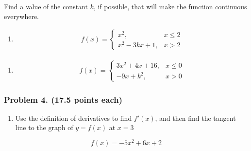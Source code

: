 \documentclass[
  letterpaper,
  DIV=11,
  numbers=noendperiod]{scrartcl}
\providecommand{\tightlist}{%
  \setlength{\itemsep}{0pt}\setlength{\parskip}{0pt}}\usepackage{longtable,booktabs,array}
\begin{document}
Find a value of the constant \(k\), if possible, that will make the
function continuous everywhere.

\begin{enumerate}
\def\labelenumi{\alph{enumi}.}
\tightlist
\item
  \begin{align*}
  f(x) =
   \left\{\begin{array}{lr}
     x^2, & x \le 2 \\
     x^2 - 3kx+1, & x > 2  
  \end{array}\right.
  \end{align*}
\end{enumerate}

\hfill\break
\hfill\break
\hfill\break
\hfill\break

\hfill\break
\hfill\break
\hfill\break
\hfill\break

\thispagestyle{empty}

\begin{enumerate}
\def\labelenumi{\alph{enumi}.}
\setcounter{enumi}{1}
\tightlist
\item
  \begin{align*}
  f(x) =
   \left\{\begin{array}{lr}
     3x^2 + 4x + 16, & x \le 0 \\
    - 9x + k^2, & x > 0
  \end{array}\right.
  \end{align*}
\end{enumerate}

\hfill\break
\hfill\break
\hfill\break
\hfill\break

\hfill\break
\hfill\break
\hfill\break
\hfill\break

\thispagestyle{empty}

\subsubsection{Problem 4. (17.5 points
each)}\label{problem-4.-17.5-points-each}

\begin{enumerate}
\def\labelenumi{\alph{enumi}.}
\tightlist
\item
  Use the definition of derivatives to find \(f'(x)\), and then find the
  tangent line to the graph of \(y = f(x)\) at \(x = 3\)
\end{enumerate}

\[
f(x) = -5x^2 + 6x + 2
\]

\hfill\break
\hfill\break
\hfill\break
\hfill\break
\end{document}
